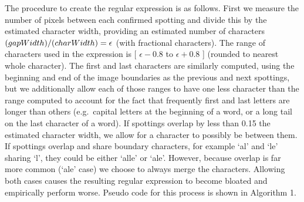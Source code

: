 \documentclass[ms,electronic,twosidetoc,letterpaper,chaptercenter,parttop,lof,lot]{byumsphd}
\begin{document}
The procedure to create the regular expression is as follows. First we measure the number of pixels between each confirmed spotting and divide this by the estimated character width, providing an estimated number of characters $\text(gapWidth)/\text(charWidth) = \epsilon$ (with fractional characters). The range of characters used in the expression is 
[ $\epsilon-0.8$ to $\epsilon+0.8$ ] (rounded to nearest whole character).
 The first and last characters are similarly computed, using the beginning and end of the image boundaries as the previous and next spottings, but we additionally allow each of those ranges to have one less character than the range computed to account for the fact that frequently first and last letters are longer than others (e.g.~capital letters at the beginning of a word, or a long tail on the last character of a word). If spottings overlap by less than 0.15 the estimated character width, we allow for a character to possibly be between them.
If spottings overlap and share boundary characters, for example `al' and `le' sharing `l', they could be either `alle' or `ale'. However, because overlap is far more common (`ale' case) we choose to always merge the characters.  Allowing both cases causes the resulting regular expression to become bloated and empirically perform worse.
Pseudo code for this process is shown in Algorithm 1.%
\end{document}
